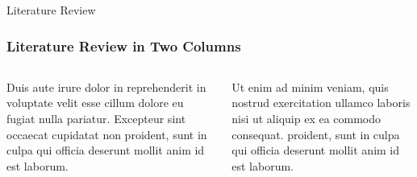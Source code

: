 \documentclass[10pt]{beamer}
\begin{document}
    \begin{frame}{Literature Review}
        \frametitle{Literature Review in Two Columns}
        \begin{columns}

            Duis aute irure dolor in reprehenderit in voluptate velit esse cillum dolore eu fugiat nulla pariatur.
            Excepteur sint occaecat cupidatat non proident, sunt in culpa qui officia deserunt mollit anim id est laborum.

            Ut enim ad minim veniam, quis nostrud exercitation ullamco laboris nisi ut aliquip ex ea commodo consequat.
            proident, sunt in culpa qui officia deserunt mollit anim id est laborum.

        \end{columns}
    \end{frame}
\end{document}
